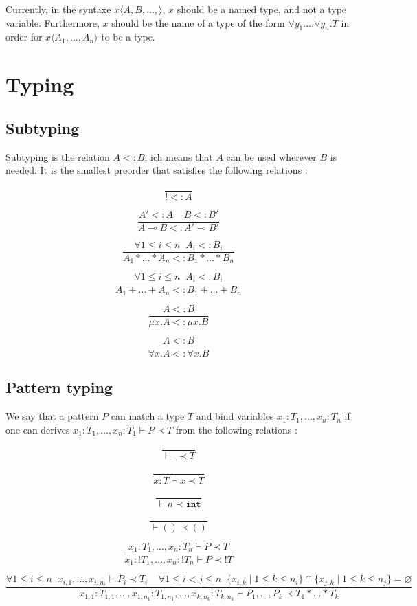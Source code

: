 \documentclass{scrartcl}
\newcommand{\linimp}{\multimap}
\newcommand{\subtype}{<\!:}
\renewcommand{\emptyset}{\varnothing}
\begin{document}
Currently, in the syntaxe $x \langle A, B, \dots, \rangle$, $x$ should be a named type, and not
a type variable. Furthermore, $x$ should be the name of a type of the form
$\forall y_1. \dots \forall y_n. T$ in order for $x \langle A_1, \dots, A_n \rangle$ to be a type.

\section{Typing}

\subsection{Subtyping}
Subtyping is the relation $A \subtype B$, ich means that $A$ can be
used wherever $B$ is needed. It is the smallest preorder that satisfies the following relations :

\[
  \frac{}{! \subtype A}
\]

\[
  \frac{A' \subtype A \;\;\;\; B \subtype B'}{A \linimp B \subtype A' \linimp B'}
\]

\[
  \frac{\forall 1 \leq i \leq n \;\; A_i \subtype B_i}{A_1 * \dots * A_n \subtype B_1 * \dots * B_n}
\]

\[
  \frac{\forall 1 \leq i \leq n \;\; A_i \subtype B_i}{A_1 + \dots + A_n \subtype B_1 + \dots + B_n}
\]

\[
  \frac{A \subtype B}{\mu x. A \subtype \mu x. B}
\]

\[
  \frac{A \subtype B}{\forall x. A \subtype \forall x. B}
\]

\subsection{Pattern typing}
We say that a pattern $P$ can match a type $T$ and bind variables $x_1: T_1, \dots, x_n: T_n$
if one can derives $x_1: T_1, \dots, x_n: T_1 \vdash P \prec T$ from the following relations :

\[
  \frac{}{\vdash \_ \prec T}
\]

\[
  \frac{}{x : T \vdash x \prec T}
\]

\[
  \frac{}{\vdash n \prec \mathtt{int}}
\]

\[
  \frac{}{\vdash () \prec ()}
\]

\[
  \frac{x_1:T_1, \dots, x_n:T_n\vdash P\prec T}
  {x_1: !T_1, \dots, x_n: !T_n\vdash P\prec !T}
\]

\[
  \frac{\forall 1 \leq i \leq n \;\; x_{i, 1}, \dots, x_{i, n_i} \vdash P_i \prec T_i
    \;\;\;\; \forall 1 \leq i < j \leq n
    \;\;\{x_{i, k} \mid 1 \leq k \leq n_i \} \cap \{x_{j, k} \mid 1 \leq k \leq n_j\} = \emptyset}
  {x_{1,1}: T_{1,1}, \dots, x_{1, n_1}: T_{1, n_1}, \dots, x_{k, n_k} : T_{k, n_k} \vdash P_1, \dots, P_k \prec T_1 * \dots * T_k}
\]
\end{document}
